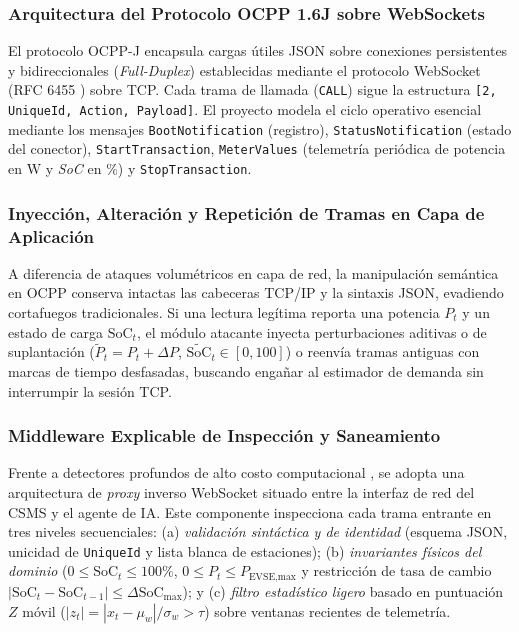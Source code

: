\documentclass[conference]{IEEEtran}
\begin{document}
\subsubsection{Arquitectura del Protocolo OCPP 1.6J sobre WebSockets}
El protocolo OCPP-J encapsula cargas útiles JSON sobre conexiones persistentes y bidireccionales (\textit{Full-Duplex}) establecidas mediante el protocolo WebSocket (RFC 6455 \cite{rfc6455}) sobre TCP. Cada trama de llamada (\texttt{CALL}) sigue la estructura \texttt{[2, UniqueId, Action, Payload]}. El proyecto modela el ciclo operativo esencial mediante los mensajes \texttt{BootNotification} (registro), \texttt{StatusNotification} (estado del conector), \texttt{StartTransaction}, \texttt{MeterValues} (telemetría periódica de potencia en $\text{W}$ y \textit{SoC} en $\%$) y \texttt{StopTransaction}.

\subsubsection{Inyección, Alteración y Repetición de Tramas en Capa de Aplicación}
A diferencia de ataques volumétricos en capa de red, la manipulación semántica en OCPP conserva intactas las cabeceras TCP/IP y la sintaxis JSON, evadiendo cortafuegos tradicionales. Si una lectura legítima reporta una potencia $P_t$ y un estado de carga $\text{SoC}_t$, el módulo atacante inyecta perturbaciones aditivas o de suplantación ($\tilde{P}_t = P_t + \Delta P$, $\widetilde{\text{SoC}}_t \in [0,100]$) o reenvía tramas antiguas con marcas de tiempo desfasadas, buscando engañar al estimador de demanda sin interrumpir la sesión TCP.

\subsubsection{Middleware Explicable de Inspección y Saneamiento}
Frente a detectores profundos de alto costo computacional \cite{jahangir2024,terruggia2025}, se adopta una arquitectura de \textit{proxy} inverso WebSocket situado entre la interfaz de red del CSMS y el agente de IA. Este componente inspecciona cada trama entrante en tres niveles secuenciales: (a) \textit{validación sintáctica y de identidad} (esquema JSON, unicidad de \texttt{UniqueId} y lista blanca de estaciones); (b) \textit{invariantes físicos del dominio} ($0 \le \text{SoC}_t \le 100\%$, $0 \le P_t \le P_{\text{EVSE,max}}$ y restricción de tasa de cambio $|\text{SoC}_t - \text{SoC}_{t-1}| \le \Delta \text{SoC}_{\max}$); y (c) \textit{filtro estadístico ligero} basado en puntuación $Z$ móvil ($|z_t| = |x_t - \mu_w|/\sigma_w > \tau$) sobre ventanas recientes de telemetría.
\end{document}

